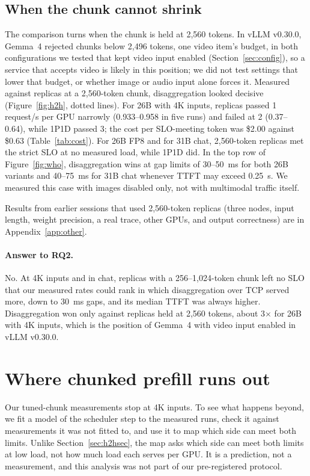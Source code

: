 \documentclass[11pt]{article}
\begin{document}
\subsection{When the chunk cannot shrink}\label{sec:fixedchunk}
The comparison turns when the chunk is held at 2,560 tokens. In vLLM v0.30.0, Gemma~4 rejected chunks below 2,496 tokens, one video item's budget, in both configurations we tested that kept video input enabled (Section~\ref{sec:config}), so a service that accepts video is likely in this position; we did not test settings that lower that budget, or whether image or audio input alone forces it. Measured against replicas at a 2,560-token chunk, disaggregation looked decisive (Figure~\ref{fig:h2h}, dotted lines). For 26B with 4K inputs, replicas passed 1 request/s per GPU narrowly (0.933--0.958 in five runs) and failed at 2 (0.37--0.64), while 1P1D passed 3; the cost per SLO-meeting token was \$2.00 against \$0.63 (Table~\ref{tab:cost}). For 26B FP8 and for 31B chat, 2,560-token replicas met the strict SLO at no measured load, while 1P1D did. In the top row of Figure~\ref{fig:who}, disaggregation wins at gap limits of 30--50~ms for both 26B variants and 40--75~ms for 31B chat whenever TTFT may exceed 0.25~s. We measured this case with images disabled only, not with multimodal traffic itself.

Results from earlier sessions that used 2,560-token replicas (three nodes, input length, weight precision, a real trace, other GPUs, and output correctness) are in Appendix~\ref{app:other}.

\paragraph{Answer to RQ2.} No. At 4K inputs and in chat, replicas with a 256--1,024-token chunk left no SLO that our measured rates could rank in which disaggregation over TCP served more, down to 30~ms gaps, and its median TTFT was always higher. Disaggregation won only against replicas held at 2,560 tokens, about 3$\times$ for 26B with 4K inputs, which is the position of Gemma~4 with video input enabled in vLLM v0.30.0.

\section{Where chunked prefill runs out}\label{sec:boundary}
Our tuned-chunk measurements stop at 4K inputs. To see what happens beyond, we fit a model of the scheduler step to the measured runs, check it against measurements it was not fitted to, and use it to map which side can meet both limits. Unlike Section~\ref{sec:h2hsec}, the map asks which side can meet both limits at low load, not how much load each serves per GPU. It is a prediction, not a measurement, and this analysis was not part of our pre-registered protocol.
\end{document}
